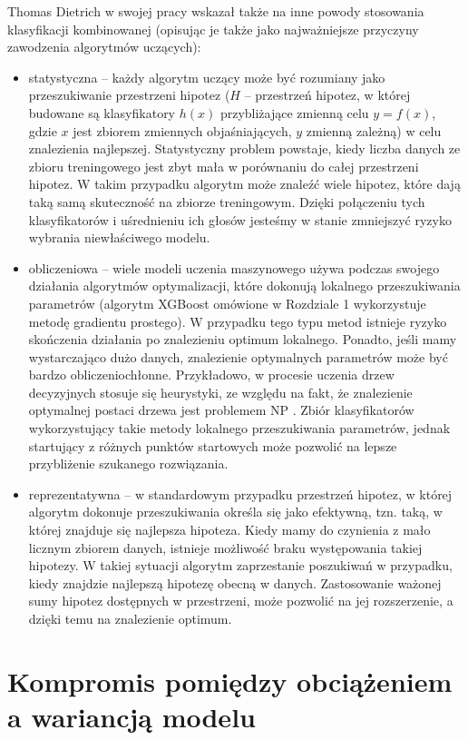 \documentclass[12pt,a4paper,twoside,openany]{book}
\begin{document}
Thomas Dietrich w swojej pracy \citep{dietterich2000} wskazał także na inne powody stosowania klasyfikacji kombinowanej (opisując je także jako najważniejsze przyczyny zawodzenia algorytmów uczących):
\begin{itemize}
\item statystyczna – każdy algorytm uczący może być rozumiany jako przeszukiwanie przestrzeni hipotez ($H$ – przestrzeń hipotez, w której budowane są klasyfikatory $h(x)$ przybliżające zmienną celu $y = f(x)$, gdzie $x$ jest zbiorem zmiennych objaśniających, $y$ zmienną zależną) w celu znalezienia najlepszej. Statystyczny problem powstaje, kiedy liczba danych ze zbioru treningowego jest zbyt mała w porównaniu do całej przestrzeni hipotez. W takim przypadku algorytm może znaleźć wiele hipotez, które dają taką samą skuteczność na zbiorze treningowym. Dzięki połączeniu tych klasyfikatorów i uśrednieniu ich głosów jesteśmy w stanie zmniejszyć ryzyko wybrania niewłaściwego modelu.
\item obliczeniowa – wiele modeli uczenia maszynowego używa podczas swojego działania algorytmów optymalizacji, które dokonują lokalnego przeszukiwania parametrów (algorytm XGBoost omówione w Rozdziale 1 wykorzystuje metodę gradientu prostego). W przypadku tego typu metod istnieje ryzyko skończenia działania po znalezieniu optimum lokalnego. Ponadto, jeśli mamy wystarczająco dużo danych, znalezienie optymalnych parametrów może być bardzo obliczeniochłonne. Przykładowo, w procesie uczenia drzew decyzyjnych stosuje się heurystyki, ze względu na fakt, że znalezienie optymalnej postaci drzewa jest problemem NP \citep{hyafil1976}. Zbiór klasyfikatorów wykorzystujący takie metody lokalnego przeszukiwania parametrów, jednak startujący z różnych punktów startowych może pozwolić na lepsze przybliżenie szukanego rozwiązania.
\item reprezentatywna – w standardowym przypadku przestrzeń hipotez, w której algorytm dokonuje przeszukiwania określa się jako efektywną, tzn. taką, w której znajduje się najlepsza hipoteza. Kiedy mamy do czynienia z mało licznym zbiorem danych, istnieje możliwość braku występowania takiej hipotezy. W takiej sytuacji algorytm zaprzestanie poszukiwań w przypadku, kiedy znajdzie najlepszą hipotezę obecną w danych. Zastosowanie ważonej sumy hipotez dostępnych w przestrzeni, może pozwolić na jej rozszerzenie, a dzięki temu na znalezienie optimum.
\end{itemize}


\section{Kompromis pomiędzy obciążeniem a wariancją modelu}
\end{document}
